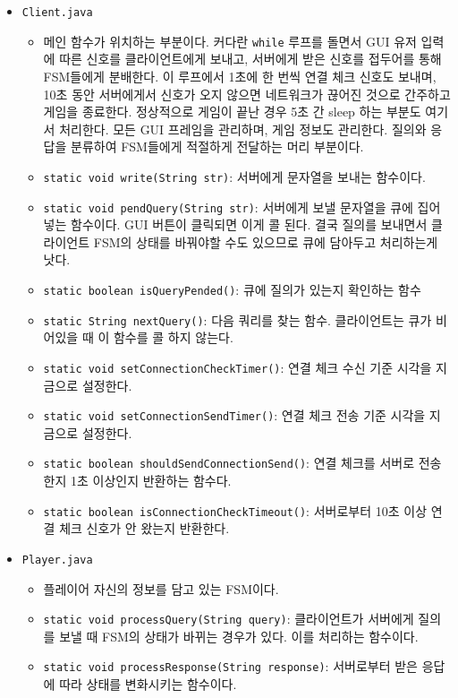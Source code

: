 \documentclass[a4paper, 10pt]{article}
\begin{document}
\begin{itemize}
  \item \texttt{Client.java}
  \begin{itemize}
    \item[] 메인 함수가 위치하는 부분이다. 커다란 \texttt{while} 루프를 돌면서 GUI 유저 입력에 따른 신호를 클라이언트에게 보내고,
    서버에게 받은 신호를 접두어를 통해 FSM들에게 분배한다. 이 루프에서 1초에 한 번씩 연결 체크 신호도 보내며, 10초 동안 서버에게서
    신호가 오지 않으면 네트워크가 끊어진 것으로 간주하고 게임을 종료한다. 정상적으로 게임이 끝난 경우 5초 간 sleep 하는 부분도 여기서 처리한다.
    모든 GUI 프레임을 관리하며, 게임 정보도 관리한다. 질의와 응답을 분류하여 FSM들에게 적절하게 전달하는 머리 부분이다.
    \item \texttt{static void write(String str)}: 서버에게 문자열을 보내는 함수이다.
    \item \texttt{static void pendQuery(String str)}: 서버에게 보낼 문자열을 큐에 집어넣는 함수이다.
    GUI 버튼이 클릭되면 이게 콜 된다. 결국 질의를 보내면서 클라이언트 FSM의 상태를 바꿔야할 수도 있으므로
    큐에 담아두고 처리하는게 낫다.
    \item \texttt{static boolean isQueryPended()}: 큐에 질의가 있는지 확인하는 함수
    \item \texttt{static String nextQuery()}: 다음 쿼리를 찾는 함수. 클라이언트는 큐가 비어있을 때 이 함수를 콜 하지 않는다.
    \item \texttt{static void setConnectionCheckTimer()}: 연결 체크 수신 기준 시각을 지금으로 설정한다.
    \item \texttt{static void setConnectionSendTimer()}: 연결 체크 전송 기준 시각을 지금으로 설정한다.
    \item \texttt{static boolean shouldSendConnectionSend()}: 연결 체크를 서버로 전송한지 1초 이상인지 반환하는 함수다.
    \item \texttt{static boolean isConnectionCheckTimeout()}: 서버로부터 10초 이상 연결 체크 신호가 안 왔는지 반환한다.
  \end{itemize}
  \item \texttt{Player.java}
  \begin{itemize}
    \item[] 플레이어 자신의 정보를 담고 있는 FSM이다.
    \item \texttt{static void processQuery(String query)}: 클라이언트가 서버에게 질의를 보낼 때 FSM의 상태가 바뀌는 경우가 있다. 이를 처리하는 함수이다.
    \item \texttt{static void processResponse(String response)}: 서버로부터 받은 응답에 따라 상태를 변화시키는 함수이다.

\end{itemize}
\end{itemize}
\end{document}
